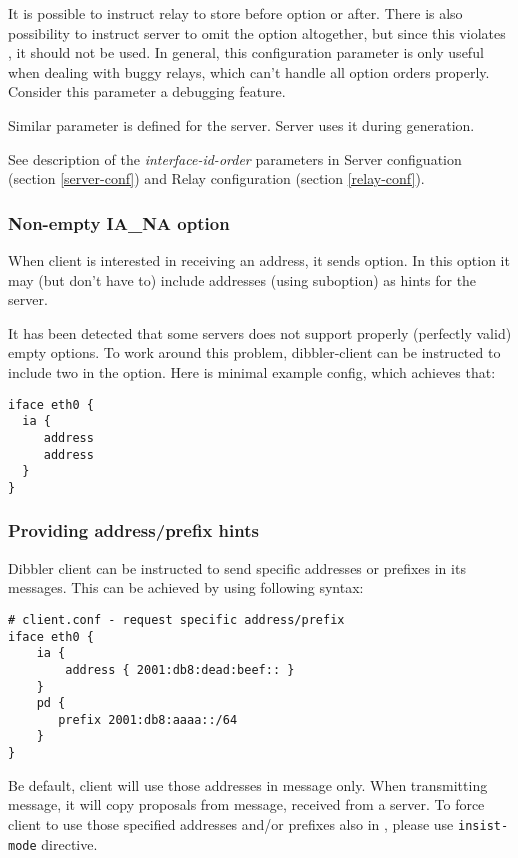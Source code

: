 It is possible to instruct relay to store  before
 option or after. There is also possibility to
instruct server to omit the  option altogether, but
since this violates \cite{rfc3315}, it should not be used. In general,
this configuration parameter is only useful when dealing with buggy
relays, which can't handle all option orders properly. Consider this
parameter a debugging feature.

Similar parameter is defined for the server. Server uses it during
 generation.

See description of the \emph{interface-id-order} parameters in Server
configuation (section \ref{server-conf}) and Relay configuration
(section \ref{relay-conf}).

\subsubsection{Non-empty IA\_NA option}
When client is interested in receiving an address, it sends
 option. In this option it may (but don't have to) include
addresses (using  suboption) as hints for the server.

It has been detected that some servers does not support properly
(perfectly valid) empty  options. To work around this
problem, dibbler-client can be instructed to include two 
in the  option. Here is minimal example config, which
achieves that:

\begin{lstlisting}
iface eth0 {
  ia {
     address
     address
  }
}
\end{lstlisting}

\subsubsection{Providing address/prefix hints}
Dibbler client can be instructed to send specific addresses or
prefixes in its  messages. This can be achieved by using
following syntax:
\begin{lstlisting}
# client.conf - request specific address/prefix
iface eth0 {
    ia {
        address { 2001:db8:dead:beef:: }
    }
    pd {
       prefix 2001:db8:aaaa::/64
    }
}
\end{lstlisting}

Be default, client will use those addresses in  message
only. When transmitting  message, it will copy proposals
from  message, received from a server. To force client
to use those specified addresses and/or prefixes also in
, please use \verb+insist-mode+ directive.

